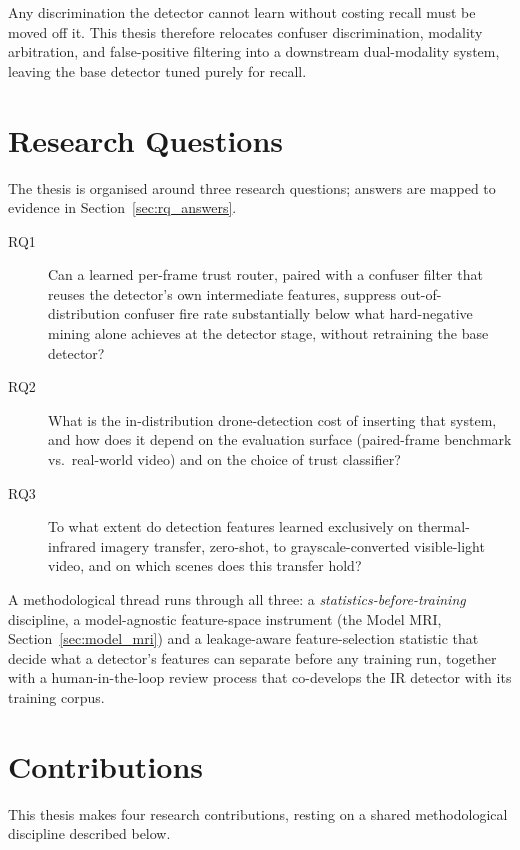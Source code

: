 Any discrimination the detector cannot learn without costing recall must be moved off it. This thesis therefore relocates confuser discrimination, modality arbitration, and false-positive filtering into a downstream dual-modality system, leaving the base detector tuned purely for recall.

\section{Research Questions}
\label{sec:rqs}

The thesis is organised around three research questions; answers are mapped to evidence in Section~\ref{sec:rq_answers}.

\begin{description}
    \item[RQ1] Can a learned per-frame trust router, paired with a confuser filter that reuses the detector's own intermediate features, suppress out-of-distribution confuser fire rate substantially below what hard-negative mining alone achieves at the detector stage, without retraining the base detector?
    \item[RQ2] What is the in-distribution drone-detection cost of inserting that system, and how does it depend on the evaluation surface (paired-frame benchmark vs.\ real-world video) and on the choice of trust classifier?
    \item[RQ3] To what extent do detection features learned exclusively on thermal-infrared imagery transfer, zero-shot, to grayscale-converted visible-light video, and on which scenes does this transfer hold?
\end{description}

A methodological thread runs through all three: a \emph{statistics-before-training} discipline, a model-agnostic feature-space instrument (the Model MRI, Section~\ref{sec:model_mri}) and a leakage-aware feature-selection statistic that decide what a detector's features can separate before any training run, together with a human-in-the-loop review process that co-develops the IR detector with its training corpus.

\section{Contributions}

This thesis makes four research contributions, resting on a shared methodological discipline described below.

